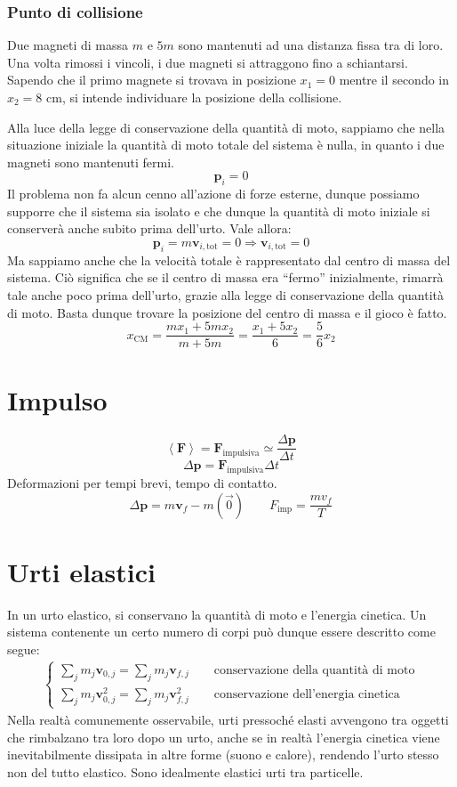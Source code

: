 \subsubsection*{Punto di collisione}
Due magneti di massa $m$ e $5m$ sono mantenuti ad una distanza fissa tra
di loro. Una volta rimossi i vincoli, i due magneti si attraggono fino a
schiantarsi. Sapendo che il primo magnete si trovava in posizione $x_1 = 0$
mentre il secondo in $x_2 = 8\text{ cm}$, si intende individuare la posizione
della collisione.

Alla luce della legge di conservazione della quantità di moto, sappiamo
che nella situazione iniziale la quantità di moto totale del sistema è
nulla, in quanto i due magneti sono mantenuti fermi.
\[ \mathbf{p}_i = 0 \]
Il problema non fa alcun cenno all'azione di forze esterne, dunque possiamo
supporre che il sistema sia isolato e che dunque la quantità di moto
iniziale si conserverà anche subito prima dell'urto. Vale allora:
\[ \mathbf{p}_i = m\mathbf{v}_{i,\text{tot}} = 0 \Rightarrow \mathbf{v}_{i,\text{tot}} = 0 \]
Ma sappiamo anche che la velocità totale è rappresentato dal centro di massa
del sistema. Ciò significa che se il centro di massa era ``fermo''
inizialmente, rimarrà tale anche poco prima dell'urto, grazie alla legge
di conservazione della quantità di moto. Basta dunque trovare la posizione
del centro di massa e il gioco è fatto.
\[ x_\text{CM} = \frac{mx_1 + 5mx_2}{m + 5m} = \frac{x_1 + 5x_2}{6} = \frac{5}{6}x_2 \]


\section{Impulso}
\[ \left\langle \mathbf{F} \right\rangle = \mathbf{F}_\text{impulsiva} \simeq \frac{\Delta\mathbf{p}}{\Delta t} \]
\[ \Delta\mathbf{p} = \mathbf{F}_\text{impulsiva}\Delta t \]
Deformazioni per tempi brevi, tempo di contatto.
\[ \Delta\mathbf{p} = m\mathbf{v}_f - m(\overrightarrow{0}) \qquad F_\text{imp} = \frac{mv_f}{T} \]


\section{Urti elastici}
In un urto elastico, si conservano la quantità di moto e l'energia cinetica.
Un sistema contenente un certo numero di corpi può dunque essere descritto come segue:
\begin{align*}
    \begin{cases}
        \sum_j m_j\mathbf{v}_{0,j} = \sum_j m_j\mathbf{v}_{f,j} \qquad \text{conservazione della quantità di moto}\\
        \sum_j m_j\mathbf{v}_{0,j}^2 = \sum_j m_j\mathbf{v}_{f,j}^2 \qquad \text{conservazione dell'energia cinetica}
    \end{cases}
\end{align*}
Nella realtà comunemente osservabile, urti pressoché elasti avvengono tra
oggetti che rimbalzano tra loro dopo un urto, anche se in realtà l'energia
cinetica viene inevitabilmente dissipata in altre forme (suono e calore), rendendo
l'urto stesso non del tutto elastico. Sono idealmente elastici urti tra
particelle.

